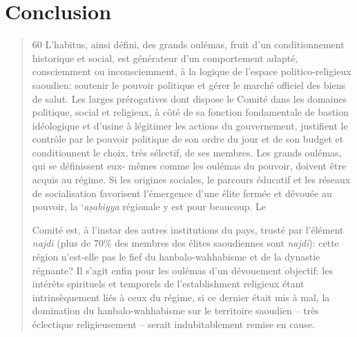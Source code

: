 \hypertarget{conclusion}{%
\section{Conclusion}\label{conclusion}}

\begin{quote}
60 L'habitus, ainsi défini, des grands oulémas, fruit d'un
conditionnement historique et social, est générateur d'un comportement
adapté, consciemment ou inconsciemment, à la logique de l'espace
politico-religieux saoudien: soutenir le pouvoir politique et gérer le
marché officiel des biens de salut. Les larges prérogatives dont dispose
le Comité dans les domaines politique, social et religieux, à côté de sa
fonction fondamentale de bastion idéologique et d'usine à légitimer les
actions du gouvernement, justifient le contrôle par le pouvoir politique
de son ordre du jour et de son budget et conditionnent le choix, très
sélectif, de ses membres. Les grands oulémas, qui se définissent eux-
mêmes comme les oulémas du pouvoir, doivent être acquis au régime. Si
les origines sociales, le parcours éducatif et les réseaux de
socialisation favorisent l'émergence d'une élite fermée et dévouée au
pouvoir, la `\emph{aṣabiyya} régionale y est pour beaucoup. Le

Comité est, à l'instar des autres institutions du pays, trusté par
l'élément \emph{najdī} (plus de 70\% des membres des élites saoudiennes
sont \emph{najdī}): cette région n'est-elle pas le fief du
hanbalo-wahhabisme et de la dynastie régnante? Il s'agit enfin pour les
oulémas d'un dévouement objectif: les intérêts spirituels et temporels
de l'establishment religieux étant intrinsèquement liés à ceux du
régime, si ce dernier était mis à mal, la domination du
hanbalo-wahhabisme sur le territoire saoudien -- très éclectique
religieusement -- serait indubitablement remise en cause.
\end{quote}
